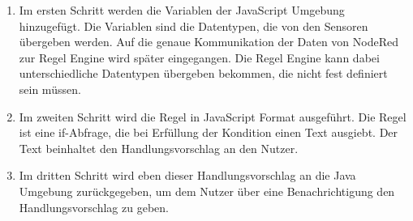\begin{enumerate}
\item Im ersten Schritt werden die Variablen der JavaScript Umgebung hinzugefügt. Die Variablen sind die Datentypen, die von den Sensoren übergeben werden. Auf die genaue Kommunikation der Daten von NodeRed zur Regel Engine wird später eingegangen. Die Regel Engine kann dabei unterschiedliche Datentypen übergeben bekommen, die nicht fest definiert sein müssen. 
\item Im zweiten Schritt wird die Regel in JavaScript Format ausgeführt. Die Regel ist eine if-Abfrage, die bei Erfüllung der Kondition einen Text ausgiebt. Der Text beinhaltet den Handlungsvorschlag an den Nutzer.
\item Im dritten Schritt wird eben dieser Handlungsvorschlag an die Java Umgebung zurückgegeben, um dem Nutzer über eine Benachrichtigung den Handlungsvorschlag zu geben.
\end{enumerate}

